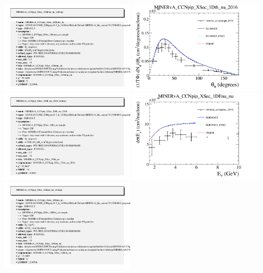\documentclass{article}
\begin{document}
\includegraphics[width=0.49\textwidth]{figures/minerva_cc1pip_angle_2016_info.png}
\centering
\includegraphics[width=0.49\textwidth]{figures/minerva_cc1pipangle_2016_comp.png}
\includegraphics[width=0.49\textwidth]{figures/minerva_cc1pipangle_2016_info.png}
\centering
\includegraphics[width=0.49\textwidth]{figures/minerva_cc1pipenu_2016_comp.png}
\includegraphics[width=0.49\textwidth]{figures/minerva_cc1pipenu_2016_info.png}
\end{document}
